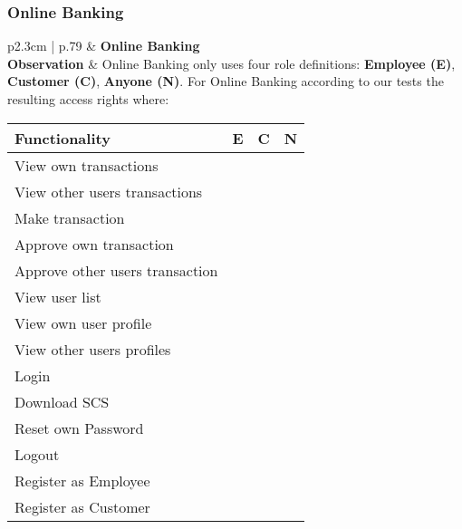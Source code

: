 \clearpage
\subsubsection{Online Banking}
\begin{longtable}[l]{ p{2.3cm} | p{.79\linewidth} }\hline
    & \textbf{Online Banking}
    \\ \hline
    \textbf{Observation} &
        Online Banking only uses four role definitions: \textbf{Employee (E)}, \textbf{Customer (C)}, \textbf{Anyone (N)}.
        For Online Banking according to our tests the resulting access rights where:
        \begin{center}
            \begin{tabular}{ | l | l | l | l |}
            \hline
            \textbf{Functionality}          & \textbf{E} & \textbf{C} & \textbf{N} \\ \hline
            View own transactions           & \xmark    & \cmark    & \xmark \\ \hline
            View other users transactions   & \cmark    & \xmark    & \xmark \\ \hline
            Make transaction                & \xmark    & \cmark    & \xmark \\ \hline
            Approve own transaction         & \xmark    & \xmark    & \xmark \\ \hline
            Approve other users transaction & \cmark    & \xmark    & \xmark \\ \hline
            View user list                  & \cmark    & \xmark    & \xmark \\ \hline
            View own user profile           & \cmark    & \cmark    & \xmark \\ \hline
            View other users profiles       & \cmark    & \xmark    & \xmark \\ \hline
            Login                           & \cmark    & \cmark    & \xmark \\ \hline
            Download SCS                    & \cmark    & \cmark    & \xmark \\ \hline
            Reset own Password              & \cmark    & \cmark    & \xmark \\ \hline
            Logout                          & \cmark    & \cmark    & \xmark \\ \hline
            Register as Employee            & \xmark    & \xmark    & \cmark \\ \hline
            Register as Customer            & \xmark    & \xmark    & \cmark \\ \hline

\end{tabular}
\end{center}
\end{longtable}
